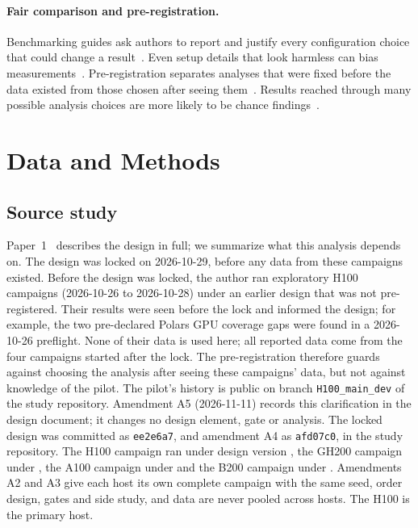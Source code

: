 \documentclass[11pt]{article}
\begin{document}
\paragraph{Fair comparison and pre-registration.} Benchmarking guides ask
authors to report and justify every configuration choice that could change a
result~\citep{raasveldt2018fair,hoefler2015scientific,kalibera2013rigorous}.
Even setup details that look harmless can bias
measurements~\citep{mytkowicz2009wrong}. Pre-registration separates analyses
that were fixed before the data existed from those chosen after seeing
them~\citep{nosek2018prereg}. Results reached through many possible analysis
choices are more likely to be chance findings~\citep{gelman2014crisis}.

\section{Data and Methods}
\label{sec:methods}

\subsection{Source study}
\label{sec:source}

Paper~1~\citep{ejiofor2026companion} describes the design in full; we
summarize what this analysis depends on. The design was locked on 2026-10-29,
before any data from these campaigns existed. Before the design was locked, the author ran exploratory H100 campaigns
(2026-10-26 to 2026-10-28) under an earlier design that was not
pre-registered. Their results were seen before the lock and informed the
design; for example, the two pre-declared Polars GPU coverage gaps were found
in a 2026-10-26 preflight. None of their data is used here; all reported data
come from the four campaigns started after the lock. The pre-registration
therefore guards against choosing the analysis after seeing these campaigns'
data, but not against knowledge of the pilot. The pilot's history is public on
branch \texttt{H100\_main\_dev} of the study repository. Amendment A5 (2026-11-11) records this
clarification in the design document; it changes no design element, gate or
analysis.
The locked design was committed as \texttt{ee2e6a7}, and amendment A4 as
\texttt{afd07c0}, in the study repository. The H100 campaign ran under design
version \texttt{}, the GH200 campaign under
\texttt{}, the A100 campaign under
\texttt{} and the B200 campaign under
\texttt{}. Amendments A2 and A3 give each
host its own complete campaign with the same seed, order design, gates and side
study, and data are never pooled across hosts. The H100 is the primary host.
\end{document}
